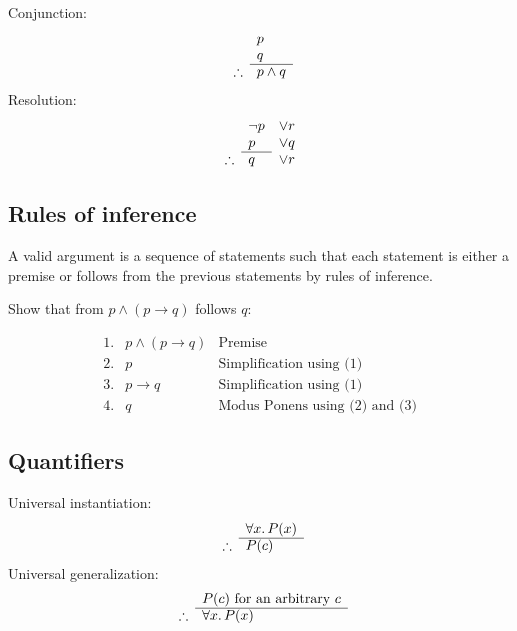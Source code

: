 Conjunction:
\begin{equation}
    \begin{array}{r l}
                   & p         \\
                   & q         \\
        \cline{2-2}
        \therefore & p \land q
    \end{array}
\end{equation}
Resolution:
\begin{equation}
    \begin{array}{r ll}
                   & \neg  p & \lor r \\
                   & p       & \lor q \\
        \cline{2-2}
        \therefore & q       & \lor r
    \end{array}
\end{equation}

\subsection{Rules of inference}
A valid argument is a sequence of statements such that each statement is either a premise or follows from the previous statements by rules of inference.

\begin{example}
    Show that from \(p \land (p \rightarrow q)\) follows \(q\):

    \begin{equation*}
        \begin{array}{rll}
            \text{1.} & p \land (p \rightarrow q) & \text{Premise}                        \\
            \text{2.} & p                         & \text{Simplification using (1)}       \\
            \text{3.} & p \rightarrow q           & \text{Simplification using (1)}       \\
            \text{4.} & q                         & \text{Modus Ponens using (2) and (3)}
        \end{array}
    \end{equation*}

\end{example}

\subsection{Quantifiers}
Universal instantiation:
\begin{equation}
    \begin{array}{r l}
                   & \forall x\ldotp P(x) \\
        \cline{2-2}
        \therefore & P(c)
    \end{array}
\end{equation}
Universal generalization:
\begin{equation}
    \begin{array}{r l}
                   & P(c) \text{ for an arbitrary } c \\
        \cline{2-2}
        \therefore & \forall x\ldotp P(x)
    \end{array}
\end{equation}

